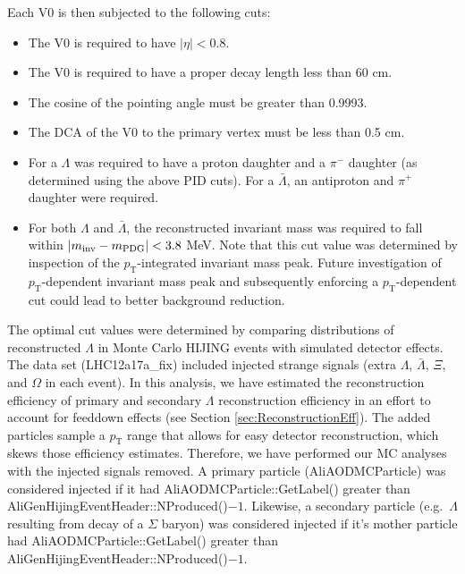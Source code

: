 Each V0 is then subjected to the following cuts:
\begin{itemize}
\item The V0 is required to have $|\eta| < 0.8$.
\item The V0 is required to have a proper decay length less than 60 cm.
\item The cosine of the pointing angle must be greater than 0.9993.
\item The DCA of the V0 to the primary vertex must be less than 0.5 cm.
\item For a $\Lambda$ was required to have a proton daughter and a $\pi^-$ daughter (as determined using the above PID cuts).  
For a $\bar{\Lambda}$, an antiproton and $\pi^+$ daughter were required.
\item For both $\Lambda$ and $\bar{\Lambda}$, the reconstructed invariant mass was required to fall within $\left\lvert m_\mathrm{inv}-m_\mathrm{PDG}\right\rvert < 3.8$ MeV.  
Note that this cut value was determined by inspection of the $p_\mathrm{T}$-integrated invariant mass peak.  
Future investigation of $p_\mathrm{T}$-dependent invariant mass peak and subsequently enforcing a $p_\mathrm{T}$-dependent cut could lead to better background reduction.  
\end{itemize}

The optimal cut values were determined by comparing distributions of reconstructed $\Lambda$ in Monte Carlo HIJING events with simulated detector effects.  
The data set (LHC12a17a\_fix) included injected strange signals (extra $\Lambda$, $\bar{\Lambda}$, $\Xi$, and $\Omega$ in each event).  
In this analysis, we have estimated the reconstruction efficiency of primary and secondary $\Lambda$ reconstruction efficiency in an effort to account for feeddown effects (see Section \ref{sec:ReconstructionEff}).
The added particles sample a $p_\mathrm{T}$ range that allows for easy detector reconstruction, which skews those efficiency estimates.
Therefore, we have performed our MC analyses with  the injected signals removed.  A primary particle (AliAODMCParticle) was considered injected if it had AliAODMCParticle::GetLabel() greater than AliGenHijingEventHeader::NProduced()$-1$. 
Likewise, a secondary particle (e.g.\ $\Lambda$ resulting from decay of a $\Sigma$ baryon) was considered injected if it's mother particle had AliAODMCParticle::GetLabel() greater than AliGenHijingEventHeader::NProduced()$-1$.  

